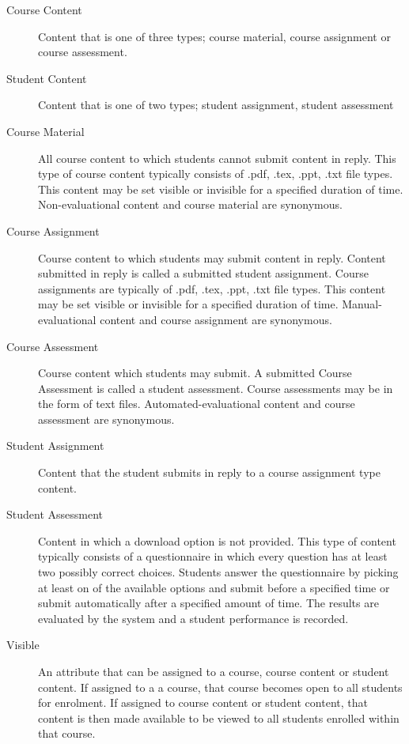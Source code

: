 \documentclass[]{article}
\begin{document}
\begin{description}
	\item [Course Content] Content that is one of three types; course material, course assignment or course assessment.

	\item [Student Content] Content that is one of two types; student assignment, student assessment

	\item [Course Material] All course content to which students cannot submit content in reply. This type of course content typically consists of .pdf, .tex, .ppt, .txt file types. This content may be set visible or invisible for a specified duration of time. Non-evaluational content and course material are synonymous.

	\item [Course Assignment] Course content to which students may submit content in reply. Content submitted in reply is called a submitted student assignment. Course assignments are typically of .pdf, .tex, .ppt, .txt file types. This content may be set visible or invisible for a specified duration of time. Manual-evaluational content and course assignment are synonymous.

	\item [Course Assessment] Course content which students may submit. A submitted Course Assessment is called a student assessment. Course assessments may be in the form of text files. Automated-evaluational content and course assessment are synonymous.

	\item [Student Assignment] Content that the student submits in reply to a course assignment type content.

	\item [Student Assessment] Content in which a download option is not provided. This type of content typically consists of a questionnaire in which every question has at least two possibly correct choices. Students answer the questionnaire by picking at least on of the available options and submit before a specified time or submit automatically after a specified amount of time. The results are evaluated by the system and a student performance is recorded.

	\item [Visible] An attribute that can be assigned to a course, course content or student content. If assigned to a a course, that course becomes open to all students for enrolment. If assigned to course content or student content, that content is then made available to be viewed to all students enrolled within that course.

\end{description}
\end{document}
